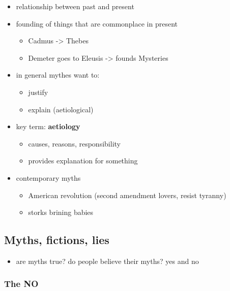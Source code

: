 \documentclass[
  12pt]{findlay}
\providecommand{\tightlist}{%
  \setlength{\itemsep}{0pt}\setlength{\parskip}{0pt}}
\begin{document}
\begin{itemize}
\tightlist
\item
  relationship between past and present
\item
  founding of things that are commonplace in present

  \begin{itemize}
  \tightlist
  \item
    Cadmus -\textgreater{} Thebes
  \item
    Demeter goes to Eleusis -\textgreater{} founds Mysteries
  \end{itemize}
\item
  in general mythes want to:

  \begin{itemize}
  \tightlist
  \item
    justify
  \item
    explain (aetiological)
  \end{itemize}
\item
  key term: \textbf{aetiology}

  \begin{itemize}
  \tightlist
  \item
    causes, reasons, responsibility
  \item
    provides explanation for something
  \end{itemize}
\item
  contemporary myths

  \begin{itemize}
  \tightlist
  \item
    American revolution (second amendment lovers, resist tyranny)
  \item
    storks brining babies
  \end{itemize}
\end{itemize}

\hypertarget{myths-fictions-lies}{%
\subsection{Myths, fictions, lies}\label{myths-fictions-lies}}

\begin{itemize}
\tightlist
\item
  are myths true? do people believe their myths? yes and no
\end{itemize}

\hypertarget{the-no}{%
\subsubsection{The NO}\label{the-no}}
\end{document}
